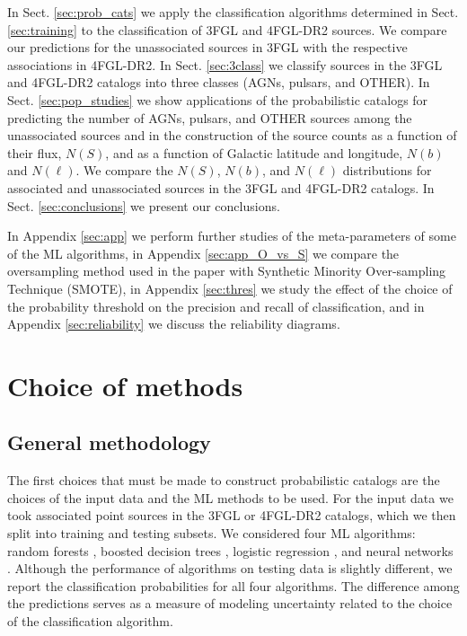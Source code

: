 \documentclass[referee]{aa} %
\newcommand{\lb}{\label}
\begin{document}
In Sect. \ref{sec:prob_cats} we apply the classification algorithms determined in Sect. \ref{sec:training} to the classification of 3FGL and 4FGL-DR2 sources.
We compare our predictions for the unassociated sources in 3FGL with the respective associations in 4FGL-DR2.
In Sect. \ref{sec:3class} we classify sources in the 3FGL and 4FGL-DR2 catalogs into three classes (AGNs, pulsars, and OTHER).
In Sect. \ref{sec:pop_studies} we show applications of the probabilistic catalogs for predicting the number of AGNs, pulsars, and OTHER sources among the unassociated sources and in the construction of the source counts as a function of their flux, $N(S)$, and as a function of 
Galactic latitude and longitude, $N(b)$ and $N(\ell)$.
We compare the $N(S)$, $N(b)$, and $N(\ell)$ distributions for associated and unassociated sources in the 3FGL and 4FGL-DR2 catalogs.
In Sect. \ref{sec:conclusions} we present our conclusions.

In Appendix \ref{sec:app} we perform further studies of the meta-parameters of some of the ML algorithms, 
in Appendix \ref{sec:app_O_vs_S} we compare the oversampling method used in the paper with Synthetic Minority Over-sampling Technique (SMOTE),
in Appendix \ref{sec:thres} we study the effect of the choice of the probability threshold on the precision and recall of classification,
and in Appendix \ref{sec:reliability} we discuss the reliability diagrams.


\section{Choice of methods}
\lb{sec:methods}


\subsection{General methodology}


The first choices that must be made to construct probabilistic catalogs are the choices of the input data and the ML methods to be used.
For the input data we took associated point sources in the 3FGL or 4FGL-DR2 catalogs, which we then split into training and testing subsets.
We considered four ML algorithms: random forests \citep[RF;][]{709601, Breiman:2001hzm}, 
boosted decision trees \citep[BDT;][]{friedman2001},  
logistic regression \citep[LR;][]{cox1958}, 
and neural networks \citep[NN;][]{Hopfield:1982pe}.
Although the performance of algorithms on testing data is slightly different, 
we report the classification probabilities for all four algorithms.
The difference among the predictions serves as a measure of modeling uncertainty related 
to the choice of the classification algorithm.
\end{document}
